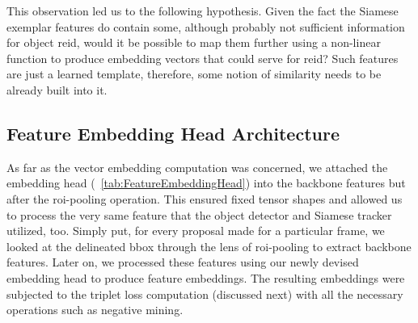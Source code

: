 This observation led us to the following hypothesis. Given the fact the Siamese exemplar features do contain some, although probably not sufficient information for object \gls{reid}, would it be possible to map them further using a non-linear function to produce embedding vectors that could serve for \gls{reid}? Such features are just a learned template, therefore, some notion of similarity needs to be already built into it.

\subsection{Feature Embedding Head Architecture}

As far as the vector embedding computation was concerned, we attached the embedding head (\tabletext{}~\ref{tab:FeatureEmbeddingHead}) into the backbone features but after the \gls{roi}-pooling operation. This ensured fixed tensor shapes and allowed us to process the very same feature that the object detector and Siamese tracker utilized, too. Simply put, for every proposal made for a particular frame, we looked at the delineated \gls{bbox} through the lens of \gls{roi}-pooling to extract backbone features. Later on, we processed these features using our newly devised embedding head to produce feature embeddings. The resulting embeddings were subjected to the triplet loss computation (discussed next) with all the necessary operations such as negative mining.

